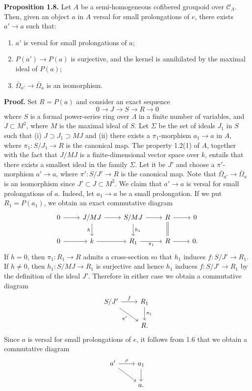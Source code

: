 \documentclass[11pt]{article}
\providecommand{\CL}{\mathcal C_\Lambda}
\begin{document}
\textbf{Proposition 1.8.} Let $A$ be a semi-homogeneous cofibered groupoid over $\CL$. Then, given an object $a$ in $A$ versal for small prolongations of $e$, there exists $a'\to a$ such that:
\begin{enumerate}[label=(\roman*)]
\item $a'$ is versal for small prolongations of $a$;
\item $P(a')\to P(a)$ is surjective, and the kernel is annihilated by the maximal ideal of $P(a)$;
\item $\bar\Omega_{a'}\to\bar\Omega_a$ is an isomorphism.
\end{enumerate}

\textbf{Proof.} Set $R=P(a)$ and consider an exact sequence
\[
 0\longrightarrow J\longrightarrow S\longrightarrow R\longrightarrow0
\]
where $S$ is a formal power-series ring over $\Lambda$ in a finite number of variables, and $J\subset M^2$, where $M$ is the maximal ideal of $S$. Let $\Sigma$ be the set of ideals $J_1$ in $S$ such that (i) $J\supset J_1\supset MJ$ and (ii) there exists a $\pi_1$-morphism $a_1\to a$ in $A$, where $\pi_1:S/J_1\to R$ is the canonical map. The property 1.2(1) of $A$, together with the fact that $J/MJ$ is a finite-dimensional vector space over $k$, entails that there exists a smallest ideal in the family $\Sigma$. Let it be $J'$ and choose a $\pi'$-morphism $a'\to a$, where $\pi':S/J'\to R$ is the canonical map. Note that $\bar\Omega_{a'}\to\bar\Omega_a$ is an isomorphism since $J'\subset J\subset M^2$. We claim that $a'\to a$ is versal for small prolongations of $a$. Indeed, let $a_1\to a$ be a small prolongation. If we put $R_1=P(a_1)$, we obtain an exact commutative diagram
\[
\begin{tikzcd}
0 \arrow[r] & J/MJ \arrow[r] \arrow[d,"h"'] & S/MJ \arrow[r] \arrow[d,"h_1"] & R \arrow[r] \arrow[d,equal] & 0\\
0 \arrow[r] & k \arrow[r] & R_1 \arrow[r,"\pi_1"'] & R \arrow[r] & 0.
\end{tikzcd}
\]
If $h=0$, then $\pi_1:R_1\to R$ admits a cross-section so that $h_1$ induces $f:S/J'\to R_1$. If $h\neq0$, then $h_1:S/MJ\to R_1$ is surjective and hence $h_1$ induces $f:S/J'\to R_1$ by the definition of the ideal $J'$. Therefore in either case we obtain a commutative diagram
\[
\begin{tikzcd}
S/J' \arrow[r,"f"] \arrow[dr,"\pi'"'] & R_1 \arrow[d,"\pi_1"]\\
& R .
\end{tikzcd}
\]
Since $a$ is versal for small prolongations of $e$, it follows from 1.6 that we obtain a commutative diagram
\[
\begin{tikzcd}
 a' \arrow[r,"\rho"] \arrow[dr] & a_1 \arrow[d]\\
& a .
\end{tikzcd}
\]
\end{document}
